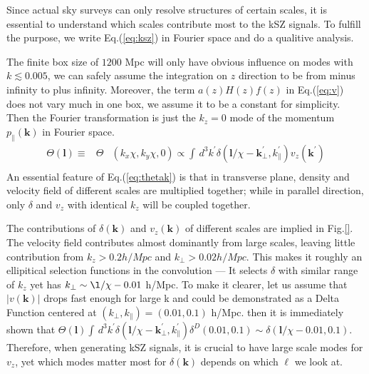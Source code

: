 Since actual sky surveys can only resolve structures of certain scales, 
it is essential to understand which scales contribute most to the kSZ signals. 
To fulfill the purpose, we write Eq.(\ref{eq:ksz}) in Fourier space and do a qualitive analysis. 

The finite box size of $1200$ Mpc will only have obvious influence on modes with $k\lesssim0.005$, 
we can safely assume the integration on $z$ direction to be from minus infinity to plus infinity. 
Moreover, the term $a(z)H(z)f(z)$ in Eq.(\ref{eq:v}) does not vary much in one box, we assume it to be a constant for simplicity. 
Then the Fourier transformation is just the $k_z=0$ mode of the momentum 
$p_\parallel(\bm{k})$ in Fourier space. 
\begin{eqnarray}
    \label{eq:thetak}
    \Theta(\bm{l})\equiv&\Theta&({k}_x\chi,{k}_y\chi,0)\propto\int\, 
    d^3k^\prime\delta(\bm{l}/\chi-\bm{k}_\perp^\prime,k_\parallel^\prime) v_z(\bm{k^\prime})\nonumber\\
    \end{eqnarray}
An essential feature of Eq.(\ref{eq:thetak}) is that
in transverse plane, density and velocity field of different scales are multiplied together;
 while in parallel direction, only $\delta$ and $v_z$ with identical $k_z$ will be coupled together.  

The contributions of $\delta(\bm{k})$ and $v_z(\bm{k})$ of different scales 
are implied in Fig.\ref{}. 
The velocity field contributes almost dominantly from large scales, 
leaving little contribution from $k_z>0.2 h/Mpc$ and $k_\perp> 0.02 h/Mpc$. 
This makes it roughly an ellipitical selection functions in the convolution
---
It selects $\delta$ with similar range of $k_z$ yet has $k_\perp\sim\l/\chi-0.01$ h/Mpc.  
To make it clearer, let us assume that $|v(\bm{k})|$ drops fast enough for 
large k and could be demonstrated as a Delta Function centered at 
$(k_\perp,k_\parallel)=(0.01,0.1)$ h/Mpc. 
then it is immediately shown that 
$\Theta(\bm{l}) \int\, 
    d^3k^\prime\delta(\bm{l}/\chi-\bm{k}_\perp^\prime,k_\parallel^\prime) 
    \delta^D(0.01,0.1)
    \sim \delta(\bm{l}/\chi-0.01,0.1)$. 
Therefore, when generating kSZ signals, 
it is crucial to have large scale modes for $v_z$, 
yet which modes matter most for $\delta(\bm{k})$ 
depends on which $\ell$ we look at.  


